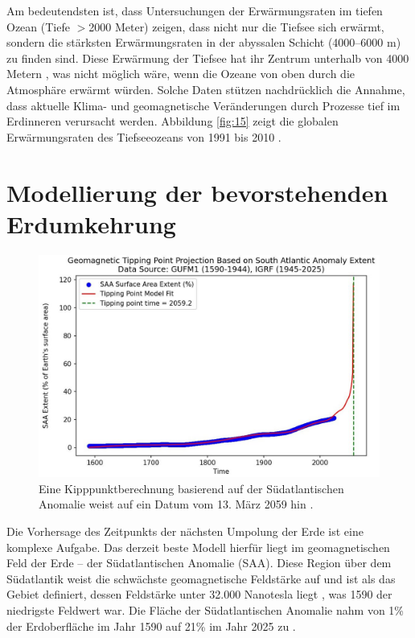\documentclass[10pt,twocolumn,letterpaper]{article}
\begin{document}
Am bedeutendsten ist, dass Untersuchungen der Erwärmungsraten im tiefen Ozean (Tiefe $>$2000 Meter) zeigen, dass nicht nur die Tiefsee sich erwärmt, sondern die stärksten Erwärmungsraten in der abyssalen Schicht (4000–6000 m) zu finden sind. Diese Erwärmung der Tiefsee hat ihr Zentrum unterhalb von 4000 Metern \cite{132,129}, was nicht möglich wäre, wenn die Ozeane von oben durch die Atmosphäre erwärmt würden. Solche Daten stützen nachdrücklich die Annahme, dass aktuelle Klima- und geomagnetische Veränderungen durch Prozesse tief im Erdinneren verursacht werden. Abbildung \ref{fig:15} zeigt die globalen Erwärmungsraten des Tiefseeozeans von 1991 bis 2010 \cite{132}.

\section{Modellierung der bevorstehenden Erdumkehrung}
\begin{figure}[b]
\begin{center}
   \includegraphics[width=1\linewidth]{saa-crop.jpeg}
\end{center}
   \caption{Eine Kipppunktberechnung basierend auf der Südatlantischen Anomalie weist auf ein Datum vom 13. März 2059 hin \cite{125,126}.}
\label{fig:16}
\label{fig:onecol}
\end{figure}

Die Vorhersage des Zeitpunkts der nächsten Umpolung der Erde ist eine komplexe Aufgabe. Das derzeit beste Modell hierfür liegt im geomagnetischen Feld der Erde – der Südatlantischen Anomalie (SAA). Diese Region über dem Südatlantik weist die schwächste geomagnetische Feldstärke auf und ist als das Gebiet definiert, dessen Feldstärke unter 32.000 Nanotesla liegt \cite{135}, was 1590 der niedrigste Feldwert war. Die Fläche der Südatlantischen Anomalie nahm von 1\% der Erdoberfläche im Jahr 1590 auf 21\% im Jahr 2025 zu \cite{136}.
\end{document}

